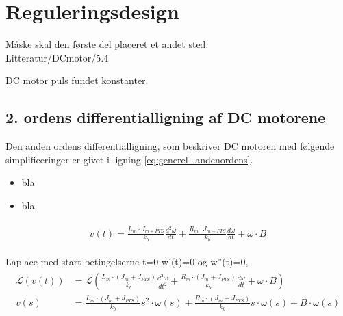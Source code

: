 \section{Reguleringsdesign}
\label{sec:kontrollerdeign}

Måske skal den første del placeret et andet sted. \\

Litteratur/DCmotor/5.4



DC motor puls fundet konstanter.
\subsection{2. ordens differentialligning af DC motorene}
Den anden ordens differentialligning, som beskriver DC motoren med følgende simplificeringer er givet i ligning \ref{eq:generel_andenordens}.
\begin{itemize}
\item bla 
\item bla 
\end{itemize}

\begin{align}
\begin{split}
v\left( t \right) =\frac { { L }_{ m }\cdot { J }_{ m+PTS } }{ { k }_{ b } } \frac { { d }^{ 2 }\omega  }{ dt } +\frac { { R }_{ m }\cdot { J }_{ m+PTS } }{ { k }_{ b } } \frac { d\omega  }{ dt } +\omega \cdot B\label{eq:generel_andenordens}
\end{split}
\end{align}

Laplace med start betingelserne t=0 w'(t)=0 og w''(t)=0,
\begin{align}
\begin{split}
\mathcal{L}\left( v\left( t \right)  \right) &=\mathcal{L}\left( \frac { { L }_{ m }\cdot \left( { J }_{ m }+{ J }_{ PTS } \right)  }{ { k }_{ b } } \frac { { d }^{ 2 }\omega  }{ { dt }^{ 2 } } +\frac { { R }_{ m }\cdot \left( { J }_{ m }+{ J }_{ PTS } \right)  }{ { k }_{ b } } \frac { d\omega  }{ dt } +\omega \cdot B \right) 
\\
v\left( s \right) &=\frac { { L }_{ m }\cdot \left( { J }_{ m }+{ J }_{ PTS } \right)  }{ { k }_{ b } } { s }^{ 2 }\cdot \omega \left( s \right) +\frac { { R }_{ m }\cdot \left( { J }_{ m }+{ J }_{ PTS } \right)  }{ { k }_{ b } } { s }\cdot \omega \left( s \right) +B\cdot \omega \left( s \right) 
\label{eq:generel_andenordens_laplace}
\end{split}
\end{align}



